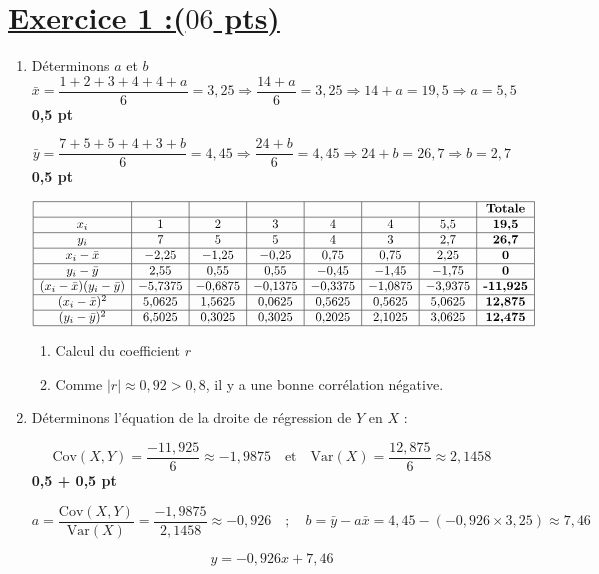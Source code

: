 \documentclass[12pt,a4paper]{article}
\begin{document}
\section*{\underline{Exercice 1 :($06$ pts)}}
\begin{enumerate}
\item Déterminons $a$ et $b$
\[
\bar{x} = \frac{1 + 2 + 3 + 4 + 4 + a}{6} = 3{,}25 
\Rightarrow \frac{14 + a}{6} = 3{,}25 
\Rightarrow 14 + a = 19{,}5 
\Rightarrow a = 5{,}5
\] \textbf{0,5 pt }

\[
\bar{y} = \frac{7 + 5 + 5 + 4 + 3 + b}{6} = 4{,}45 
\Rightarrow \frac{24 + b}{6} = 4{,}45 
\Rightarrow 24 + b = 26{,}7 
\Rightarrow b = 2{,}7
\]\textbf{0,5 pt }

\[
\begin{array}{|c|c|c|c|c|c|c|c|}
\hline
&  &  &  &  &  &  & \textbf{Totale} \\
\hline
x_i & 1 & 2 & 3 & 4 & 4 & 5{,}5 & \textbf{19{,}5} \\
\hline
y_i & 7 & 5 & 5 & 4 & 3 & 2{,}7 & \textbf{26{,}7} \\
\hline
x_i - \bar{x} & -2{,}25 & -1{,}25 & -0{,}25 & 0{,}75 & 0{,}75 & 2{,}25 & \textbf{0} \\
\hline
y_i - \bar{y} & 2{,}55 & 0{,}55 & 0{,}55 & -0{,}45 & -1{,}45 & -1{,}75 & \textbf{0} \\
\hline
(x_i - \bar{x})(y_i - \bar{y}) & -5{,}7375 & -0{,}6875 & -0{,}1375 & -0{,}3375 & -1{,}0875 & -3{,}9375 & \textbf{-11{,}925} \\
\hline
(x_i - \bar{x})^2 & 5{,}0625 & 1{,}5625 & 0{,}0625 & 0{,}5625 & 0{,}5625 & 5{,}0625 & \textbf{12{,}875} \\
\hline
(y_i - \bar{y})^2 & 6{,}5025 & 0{,}3025 & 0{,}3025 & 0{,}2025 & 2{,}1025 & 3{,}0625 & \textbf{12{,}475} \\
\hline
\end{array}
\]
\begin{enumerate}
    \item Calcul du coefficient \( r \)
\item Comme \( |r| \approx 0{,}92 > 0{,}8 \), il y a une bonne corrélation négative.
\end{enumerate}

\item Déterminons l'équation de la droite de régression de \( Y \) en \( X \) :

\[
\text{Cov}(X,Y) = \frac{-11{,}925}{6} \approx -1{,}9875
\quad \text{et} \quad 
\text{Var}(X) = \frac{12{,}875}{6} \approx 2{,}1458
\]\textbf{0,5 + 0,5 pt }

\[
a = \frac{\text{Cov}(X,Y)}{\text{Var}(X)} = \frac{-1{,}9875}{2{,}1458} \approx -0{,}926
\quad ; \quad 
b = \bar{y} - a \bar{x} = 4{,}45 - (-0{,}926 \times 3{,}25) \approx 7{,}46
\]

\[
\boxed{y = -0{,}926x + 7{,}46}
\]
\end{enumerate}
\end{document}
